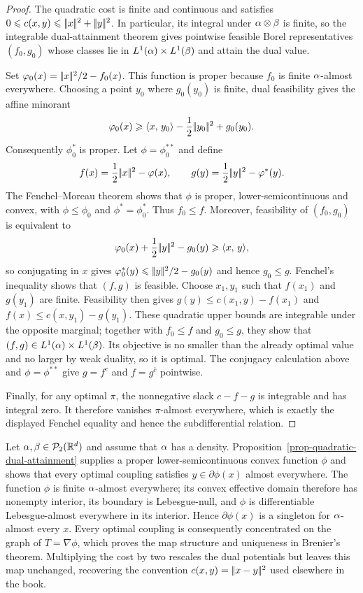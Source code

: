 \begin{proof}
	The quadratic cost is finite and continuous and satisfies $0\leqslant c(x,y)\leqslant|\!| x |\!|^2+|\!| y |\!|^2$. In particular, its integral under $\alpha\otimes\beta$ is finite, so the integrable dual-attainment theorem gives pointwise feasible Borel representatives $(f_0,g_0)$ whose classes lie in $L^1(\alpha)\times L^1(\beta)$ and attain the dual value.

	Set $\varphi_0(x)=|\!| x |\!|^2/2-f_0(x)$. This function is proper because $f_0$ is finite $\alpha$-almost everywhere. Choosing a point $y_0$ where $g_0(y_0)$ is finite, dual feasibility gives the affine minorant
	\[
		\varphi_0(x)\geqslant \langle x,\,y_0\rangle-\frac12|\!| y_0 |\!|^2+g_0(y_0).
	\]
	Consequently $\phi_0^*$ is proper. Let $\phi=\phi_0^{**}$ and define
	\[
		f(x)=\frac12|\!| x |\!|^2-\varphi(x),
		\qquad
		g(y)=\frac12|\!| y |\!|^2-\varphi^*(y).
	\]
	The Fenchel--Moreau theorem shows that $\phi$ is proper, lower-semicontinuous and convex, with $\phi\leq\phi_0$ and $\phi^*=\phi_0^*$. Thus $f_0\leq f$. Moreover, feasibility of $(f_0,g_0)$ is equivalent to
	\[
		\varphi_0(x)+\frac12|\!| y |\!|^2-g_0(y)\geqslant\langle x,\,y\rangle,
	\]
	so conjugating in $x$ gives $\varphi_0^*(y)\leqslant|\!| y |\!|^2/2-g_0(y)$ and hence $g_0\leq g$. Fenchel's inequality shows that $(f,g)$ is feasible. Choose $x_1,y_1$ such that $f(x_1)$ and $g(y_1)$ are finite. Feasibility then gives
	$g(y)\leq c(x_1,y)-f(x_1)$ and $f(x)\leq c(x,y_1)-g(y_1)$. These quadratic upper bounds are integrable under the opposite marginal; together with $f_0\leq f$ and $g_0\leq g$, they show that $(f,g)\in L^1(\alpha)\times L^1(\beta)$. Its objective is no smaller than the already optimal value and no larger by weak duality, so it is optimal. The conjugacy calculation above and $\phi=\phi^{**}$ give $g=f^c$ and $f=g^{\bar c}$ pointwise.

	Finally, for any optimal $\pi$, the nonnegative slack $c-f-g$ is integrable and has integral zero. It therefore vanishes $\pi$-almost everywhere, which is exactly the displayed Fenchel equality and hence the subdifferential relation.
\end{proof}

\begin{rem}\label{rem-proof-brenier}
	Let $\alpha,\beta\in\mathcal{P}_2(\mathbb{R}^d)$ and assume that $\alpha$ has a density. Proposition~\ref{prop-quadratic-dual-attainment} supplies a proper lower-semicontinuous convex function $\phi$ and shows that every optimal coupling satisfies $y\in\partial\phi(x)$ almost everywhere. The function $\phi$ is finite $\alpha$-almost everywhere; its convex effective domain therefore has nonempty interior, its boundary is Lebesgue-null, and $\phi$ is differentiable Lebesgue-almost everywhere in its interior. Hence $\partial\phi(x)$ is a singleton for $\alpha$-almost every $x$. Every optimal coupling is consequently concentrated on the graph of $T=\nabla\phi$, which proves the map structure and uniqueness in Brenier's theorem. Multiplying the cost by two rescales the dual potentials but leaves this map unchanged, recovering the convention $c(x,y)=|\!| x-y |\!|^2$ used elsewhere in the book.
\end{rem}


